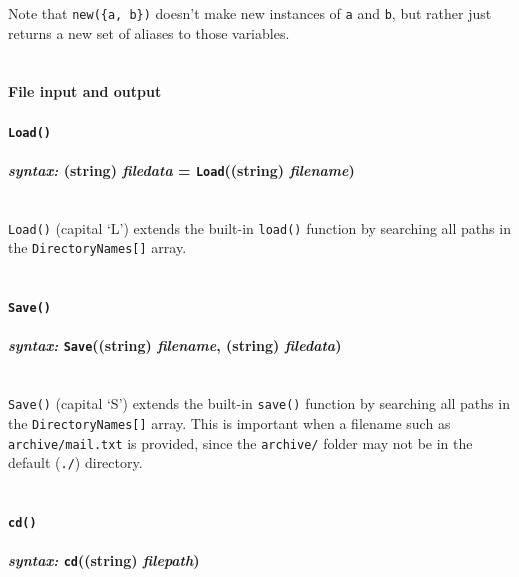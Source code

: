 \documentclass{article}
\begin{document}
Note that \verb#new({a, b})# doesn't make new instances of  \verb#a# and \verb#b#, but rather just returns a new set of aliases to those variables.\\\\





\paragraph{File input and output}


\paragraph{\texttt{Load()}\\\\
\normalfont \emph{syntax: } (string) \emph{filedata} = \texttt{Load}((string) \emph{filename})\\\\}

\texttt{Load()} (capital `L') extends the built-in \texttt{load()} function by searching all paths in the \texttt{DirectoryNames[]} array.\\\\


\paragraph{\texttt{Save()}\\\\
\normalfont \emph{syntax: } \texttt{Save}((string) \emph{filename}, (string) \emph{filedata})\\\\}

\texttt{Save()} (capital `S') extends the built-in \texttt{save()} function by searching all paths in the \texttt{DirectoryNames[]} array.  This is important when a filename such as \verb#archive/mail.txt# is provided, since the \verb#archive/# folder may not be in the default (\verb#./#) directory.\\\\


\paragraph{\texttt{cd()}\\\\
\normalfont \emph{syntax: } \texttt{cd}((string) \emph{filepath})\\\\}
\end{document}
